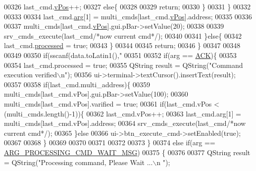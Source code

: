 \begin{DoxyCode}
{{{{{{{{{{{{{{{00326                      last\_cmd.\hyperlink{a00004_a2b48b371fd84be2a8ad581b1ad708b88}{vPos}++;
00327                  \textcolor{keywordflow}{else}\{
00328 
00329                      \textcolor{keywordflow}{return};
00330                   \}
00331                  \}
00332 
00333 
00334                  last\_cmd.\hyperlink{a00004_a56e6c2d7315d0ae60a51e8b140c9cfe4}{arg}[1] = multi\_cmds[last\_cmd.\hyperlink{a00004_a2b48b371fd84be2a8ad581b1ad708b88}{vPos}].address;
00335 
00336 
00337                  multi\_cmds[last\_cmd.\hyperlink{a00004_a2b48b371fd84be2a8ad581b1ad708b88}{vPos}].gui.pBar->setValue(20);
00338 
00339                  srv\_cmds\_execute(last\_cmd\textcolor{comment}{/*now current cmd*/});
00340 
00341              \}\textcolor{keywordflow}{else}\{
00342                  last\_cmd.\hyperlink{a00004_a3e88f779da9798a5da7dda227e2ca388}{processed} = \textcolor{keyword}{true};
00343              \}
00344 
00345              \textcolor{keywordflow}{return};
00346      \}
00347 
00348 
00349 
00350     \textcolor{keywordflow}{if}(sscanf(data.toLatin1(),\textcolor{stringliteral}{"%
00351 
00352        \textcolor{keywordflow}{if}(arg == \hyperlink{a00090_a6f6489887e08bff4887d0bc5dcf214d8}{ACK})\{
00353 
00354                     last\_cmd.processed = \textcolor{keyword}{true};
00355                     QString result =  QString(\textcolor{stringliteral}{"Command execution verified\(\backslash\)n"});
00356                     ui->terminal->textCursor().insertText(result);
00357 
00358                     \textcolor{keywordflow}{if}(last\_cmd.multi\_address)\{
00359                          multi\_cmds[last\_cmd.vPos].gui.pBar->setValue(100);
00360                          multi\_cmds[last\_cmd.vPos].varified = \textcolor{keyword}{true};
00361                      \textcolor{keywordflow}{if}(last\_cmd.vPos < (multi\_cmds.length()-1))\{
00362                         last\_cmd.vPos++;
00363                         last\_cmd.arg[1] = multi\_cmds[last\_cmd.vPos].address;
00364                         srv\_cmds\_execute(last\_cmd\textcolor{comment}{/*now current cmd*/});
00365                     \}\textcolor{keywordflow}{else}
00366                         ui->btn\_execute\_cmd->setEnabled(\textcolor{keyword}{true});
00367 
00368                     \}
00369 
00370 
00371 
00372 
00373        \}
00374        \textcolor{keywordflow}{else} \textcolor{keywordflow}{if}(arg == \hyperlink{a00090_a89228259ebf351e938853637ef163a1b}{ARG\_PROCESSING\_CMD\_WAIT\_MSG})
00375        \{
00376 
00377                 QString result =  QString(\textcolor{stringliteral}{"Processing command, Please Wait ...\(\backslash\)n "});
}}}}}}}}}}}}}}}}
\end{DoxyCode}
